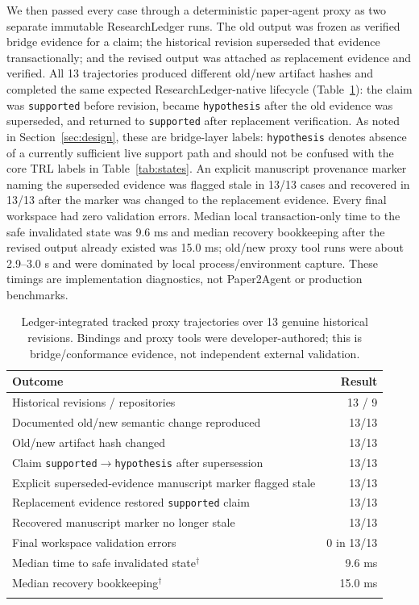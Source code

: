 \documentclass[journal]{IEEEtran}
\begin{document}
We then passed every case through a deterministic paper-agent proxy as two separate immutable ResearchLedger runs. The old output was frozen as verified bridge evidence for a claim; the historical revision superseded that evidence transactionally; and the revised output was attached as replacement evidence and verified. All 13 trajectories produced different old/new artifact hashes and completed the same expected ResearchLedger-native lifecycle (Table~\ref{tab:tracked_proxy}): the claim was \texttt{supported} before revision, became \texttt{hypothesis} after the old evidence was superseded, and returned to \texttt{supported} after replacement verification. As noted in Section~\ref{sec:design}, these are bridge-layer labels: \texttt{hypothesis} denotes absence of a currently sufficient live support path and should not be confused with the core TRL labels in Table~\ref{tab:states}. An explicit manuscript provenance marker naming the superseded evidence was flagged stale in 13/13 cases and recovered in 13/13 after the marker was changed to the replacement evidence. Every final workspace had zero validation errors. Median local transaction-only time to the safe invalidated state was 9.6 ms and median recovery bookkeeping after the revised output already existed was 15.0 ms; old/new proxy tool runs were about 2.9--3.0 s and were dominated by local process/environment capture. These timings are implementation diagnostics, not Paper2Agent or production benchmarks.

\begin{table}[t]
\centering
\caption{Ledger-integrated tracked proxy trajectories over 13 genuine historical revisions. Bindings and proxy tools were developer-authored; this is bridge/conformance evidence, not independent external validation.}
\label{tab:tracked_proxy}
\scriptsize
\begin{tabularx}{\columnwidth}{>{\raggedright\arraybackslash}Xr}
\toprule
Outcome & Result \\
\midrule
Historical revisions / repositories & 13 / 9 \\
Documented old/new semantic change reproduced & 13/13 \\
Old/new artifact hash changed & 13/13 \\
Claim \texttt{supported}$\to$\texttt{hypothesis} after supersession & 13/13 \\
Explicit superseded-evidence manuscript marker flagged stale & 13/13 \\
Replacement evidence restored \texttt{supported} claim & 13/13 \\
Recovered manuscript marker no longer stale & 13/13 \\
Final workspace validation errors & 0 in 13/13 \\
Median time to safe invalidated state$^\dagger$ & 9.6 ms \\
Median recovery bookkeeping$^\dagger$ & 15.0 ms \\
\bottomrule
\multicolumn{2}{l}{\scriptsize $^\dagger$Excludes generation of the revised tool output; local proxy diagnostic only.}
\end{tabularx}
\end{table}
\end{document}
